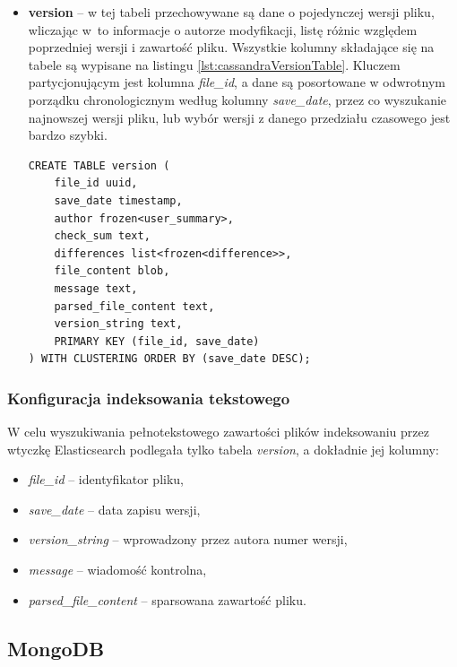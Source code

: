 \begin{itemize}
    \item \textbf{version} -- w tej tabeli przechowywane są dane o pojedynczej wersji pliku, wliczając w~to informacje o autorze modyfikacji, listę różnic względem poprzedniej wersji i zawartość pliku.
    Wszystkie kolumny składające się na tabele są wypisane na listingu \ref{lst:cassandraVersionTable}.
    Kluczem partycjonującym jest kolumna \textit{file\_id}, a dane są posortowane w odwrotnym porządku chronologicznym według kolumny \textit{save\_date}, przez co wyszukanie najnowszej wersji pliku, lub wybór wersji z danego przedziału czasowego jest bardzo szybki.
    
    \begin{minipage}{\linewidth}
    \begin{lstlisting}[language=CQL,caption={Definicja tabeli \textit{version}},label={lst:cassandraVersionTable}]
CREATE TABLE version (
    file_id uuid,
    save_date timestamp,
    author frozen<user_summary>,
    check_sum text,
    differences list<frozen<difference>>,
    file_content blob,
    message text,
    parsed_file_content text,
    version_string text,
    PRIMARY KEY (file_id, save_date)
) WITH CLUSTERING ORDER BY (save_date DESC);
    \end{lstlisting}
    \end{minipage}
\end{itemize}

\subsubsection{Konfiguracja indeksowania tekstowego} \label{sec:cassandraTextIndexConfig}

W celu wyszukiwania pełnotekstowego zawartości plików indeksowaniu przez wtyczkę Elasticsearch podlegała tylko tabela \textit{version},
a dokładnie jej kolumny:
\begin{itemize}
    \item \textit{file\_id} -- identyfikator pliku,
    \item \textit{save\_date} -- data zapisu wersji,
    \item \textit{version\_string} -- wprowadzony przez autora numer wersji,
    \item \textit{message} -- wiadomość kontrolna,
    \item \textit{parsed\_file\_content} -- sparsowana zawartość pliku.
\end{itemize}

\subsection{MongoDB}

